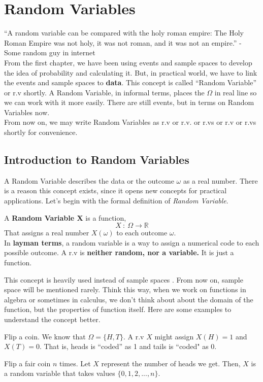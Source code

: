 \chapter{Random Variables}
``A random variable can be compared with the holy roman empire: The Holy Roman Empire was not holy, it was not roman, and it was not an empire.'' - Some random guy in internet \\ 

From the first chapter, we have been using events and sample spaces to develop the idea of probability and calculating it. But, in practical world,  we have to link the events and sample spaces to \textbf{data}. This concept is called ``Random Variable'' or r.v shortly.
A Random Variable, in informal terms, places the $\Omega$ in real line so we can work with it more easily. There are still events, but in terms on Random Variables now.
\\From now on, we may write Random Variables as r.v or r.v. or r.vs or r.v or r.vs shortly for convenience.



\section{Introduction to Random Variables}

A Random Variable describes the data or the outcome $\omega$ as a real number. There is a reason this concept exists, since it opens new concepts for practical applications.
\newline
Let's begin with the formal definition of \textit{ Random Variable}.

\begin{definition}
    A \textbf{Random Variable X} is a function,
    $$ X \ : \ \Omega \rightarrow \mathbb{R}$$
    That assigns a real number $X(\omega)$ to each outcome $\omega$. \\
    In \textbf{layman terms}, a random variable is a way to assign a numerical code to each possible outcome. A r.v is \textbf{neither random, nor a variable.} It is just a function. 
\end{definition}

This concept is heavily used instead of sample spaces . From now on, sample space will be mentioned rarely. Think this way, when we work on functions in algebra or sometimes in calculus, we don't think about about the domain of the function, but the properties of function itself.
Here are some examples to understand the concept better.
\begin{example} Flip a coin. We know that $\Omega =\{H,T\}$. A r.v $X$ might assign $X(H) = 1$ and $X(T) = 0$. That is, heads is ``coded'' as 1 and tails is ``coded" as 0.
    
\end{example}
\begin{example}
    Flip a fair coin $n$ times. Let $X$ represent the number of heads we get. Then, $X$ is a random variable that takes values $\{0,1,2,...,n\}$.
\end{example}

